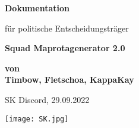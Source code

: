 \begin{titlepage}


    \begin{center}
    \end{center}

    \begin{center}
        \vspace*{1cm}
        \Large
        \textbf{Dokumentation}

        \vspace*{0.5cm}
        \normalsize
        für politische Entscheidungsträger

        \vspace*{1cm}
        \huge
        \textbf{Squad Maprotagenerator 2.0}\\
        \vspace{0.5cm}
        

        \vspace{1.5cm}
        \Large
        \textbf{von}\\
        \textbf{Timbow, Fletschoa, KappaKay}

        \vspace{0.5cm}
        \normalsize

        \vspace{1.5cm}
        SK Discord, 29.09.2022

        \vspace{3.3cm}

        \texttt{[image: SK.jpg]}
    
    \end{center}
\end{titlepage}
